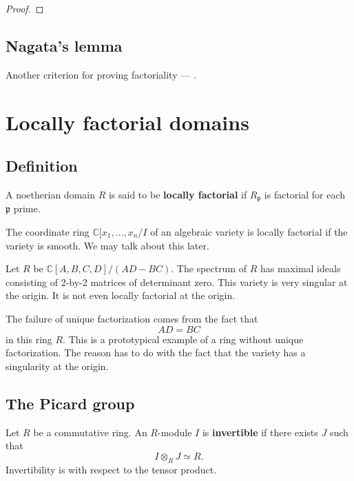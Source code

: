 \begin{proof} 
\end{proof} 
\subsection{Nagata's lemma}

Another criterion for proving factoriality --- .




\section{Locally factorial domains}

\subsection{Definition}
\begin{definition} 
A noetherian domain $R$ is said to be \textbf{locally factorial} if
$R_{\mathfrak{p}}$ is factorial for each $\mathfrak{p}$ prime.
\end{definition} 

\begin{example} 
The coordinate ring $\mathbb{C}[x_1, \dots, x_n/I$ of an algebraic variety is
locally factorial if the variety is smooth. We may talk about this later. 
\end{example} 

\begin{example}[Nonexample]
Let $R$ be $\mathbb{C}[A,B,C,D]/(AD - BC)$. The spectrum of $R$ has maximal
ideals consisting of 2-by-2 matrices of determinant zero. This variety is very
singular at the origin. It is not even locally factorial at the origin.

The failure of unique factorization comes from the fact that
\[ AD = BC  \]
in this ring $R$. This is a prototypical example of a ring without unique
factorization. The reason has to do with the fact that the variety has a
singularity at the origin. 
\end{example} 

\subsection{The Picard group}

\begin{definition} 
Let $R$ be a commutative ring. An $R$-module $I$ is \textbf{invertible} if
there exists $J$ such that
\[ I \otimes_R J \simeq R.  \]
Invertibility  is with respect to the tensor product.
\end{definition} 

